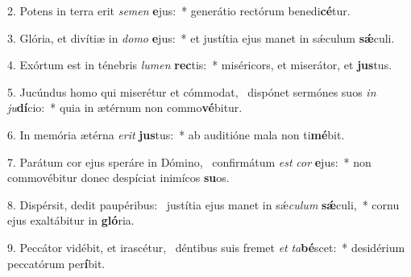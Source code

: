 2. Potens in terra erit \textit{se}\textit{men} \textbf{e}jus:~*  generátio rectórum benedi\textbf{cé}tur.\

3. Glória, et divítiæ in \textit{do}\textit{mo} \textbf{e}jus:~*  et justítia ejus manet in sǽculum \textbf{sǽ}culi.\

4. Exórtum est in ténebris \textit{lu}\textit{men} \textbf{rec}tis:~*  miséricors, et miserátor, et \textbf{jus}tus.\

5. Jucúndus homo qui miserétur et cómmodat, \dag\  dispónet sermónes suos \textit{in} \textit{ju}\textbf{dí}cio:~*  quia in ætérnum non commo\textbf{vé}bitur.\

6. In memória ætérna \textit{e}\textit{rit} \textbf{jus}tus:~*  ab auditióne mala non ti\textbf{mé}bit.\

7. Parátum cor ejus speráre in Dómino, \dag\  confirmátum \textit{est} \textit{cor} \textbf{e}jus:~*  non commovébitur donec despíciat inimícos \textbf{su}os.\

8. Dispérsit, dedit paupéribus: \dag\  justítia ejus manet in sǽ\textit{cu}\textit{lum} \textbf{sǽ}culi,~*  cornu ejus exaltábitur in \textbf{gló}ria.\

9. Peccátor vidébit, et irascétur, \dag\  déntibus suis fremet \textit{et} \textit{ta}\textbf{bé}scet:~*  desidérium peccatórum per\textbf{í}bit.\

